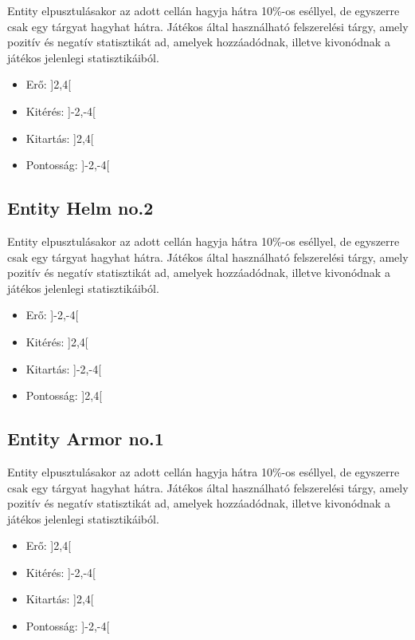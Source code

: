 Entity elpusztulásakor az adott cellán hagyja hátra 10\%-os eséllyel, de egyszerre csak egy tárgyat hagyhat hátra.
Játékos által használható felszerelési tárgy, amely pozitív és negatív statisztikát ad, amelyek hozzáadódnak, illetve kivonódnak a játékos jelenlegi statisztikáiból.

\begin{itemize}
    \item Erő: ]2,4[
    \item Kitérés: ]-2,-4[
    \item Kitartás: ]2,4[
    \item Pontosság: ]-2,-4[
\end{itemize}

\subsection{Entity Helm no.2}

Entity elpusztulásakor az adott cellán hagyja hátra 10\%-os eséllyel, de egyszerre csak egy tárgyat hagyhat hátra.
Játékos által használható felszerelési tárgy, amely pozitív és negatív statisztikát ad, amelyek hozzáadódnak, illetve kivonódnak a játékos jelenlegi statisztikáiból.

\begin{itemize}
    \item Erő: ]-2,-4[
    \item Kitérés: ]2,4[
    \item Kitartás: ]-2,-4[
    \item Pontosság: ]2,4[
\end{itemize}

\subsection{Entity Armor no.1}

Entity elpusztulásakor az adott cellán hagyja hátra 10\%-os eséllyel, de egyszerre csak egy tárgyat hagyhat hátra.
Játékos által használható felszerelési tárgy, amely pozitív és negatív statisztikát ad, amelyek hozzáadódnak, illetve kivonódnak a játékos jelenlegi statisztikáiból.

\begin{itemize}
    \item Erő: ]2,4[
    \item Kitérés: ]-2,-4[
    \item Kitartás: ]2,4[
    \item Pontosság: ]-2,-4[
\end{itemize}

